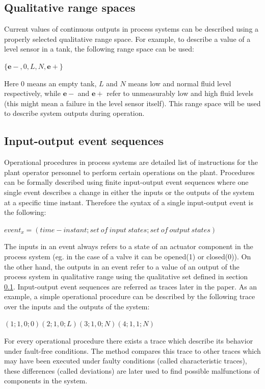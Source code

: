 \documentclass[conference]{IEEEtran}
\begin{document}
\subsection{Qualitative range spaces}
\label{sec:qualrngspc}
Current values of continuous outputs in process systems can be described using a properly selected qualitative range space. For example, to describe a value of a level sensor in a tank, the following range space can be used:

$\{\mathbf{e-},0,L,N,\mathbf{e+}\}$

Here $0$ means an empty tank, $L$ and $N$ means low and normal fluid level respectively, while $\mathbf{e-}$ and $\mathbf{e+}$ refer to unmeasurably low and high fluid levels (this might mean a failure in the level sensor itself). This range space will be used to describe system outputs during operation.

\subsection{Input-output event sequences}
\label{sec:ioseq}

Operational procedures in process systems are detailed list of instructions for the plant operator personnel to perform certain operations on the plant. Procedures can be formally described using finite input-output event sequences where one single event describes a change in either the inputs or the outputs of the system at a specific time instant. Therefore the syntax of a single input-output event is the following:

$event_x=(time-instant;{set~of~input~states};{set~of~output~states})$

The inputs in an event always refers to a state of an actuator component in the process system (eg. in the case of a valve it can be opened(1) or closed(0)). On the other hand, the outputs in an event refer to a value of an output of the process system in qualitative range using the qualitative set defined in section \ref{sec:qualrngspc}. Input-output event sequences are referred as traces later in the paper. As an example, a simple operational procedure can be described by the following trace over the inputs and the outputs of the system:

$(1;1,0;0) (2;1,0;L) (3;1,0;N) (4;1,1;N)$

For every operational procedure there exists a trace which describe its behavior under fault-free conditions. The method compares this trace to other traces which may have been executed under faulty conditions (called characteristic traces), these differences (called deviations) are later used to find possible malfunctions of components in the system.
\end{document}
